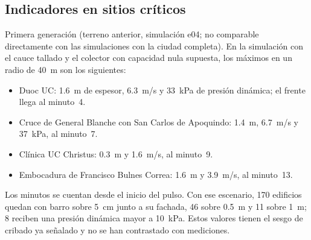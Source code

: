 \subsection{Indicadores en sitios críticos}\label{sec:res-indicadores}
Primera generación (terreno anterior, simulación e04; no comparable directamente con las simulaciones con la ciudad completa). En la simulación con el cauce tallado y el colector con capacidad nula supuesta, los máximos en un radio de \SI{40}{m} son los siguientes:
\begin{itemize}
\item Duoc UC: \SI{1,6}{m} de espesor, \SI{6,3}{m/s} y \SI{33}{kPa} de presión dinámica; el frente llega al minuto~4.
\item Cruce de General Blanche con San Carlos de Apoquindo: \SI{1,4}{m}, \SI{6,7}{m/s} y \SI{37}{kPa}, al minuto~7.
\item Clínica UC Christus: \SI{0,3}{m} y \SI{1,6}{m/s}, al minuto~9.
\item Embocadura de Francisco Bulnes Correa: \SI{1,6}{m} y \SI{3,9}{m/s}, al minuto~13.
\end{itemize}
Los minutos se cuentan desde el inicio del pulso. Con ese escenario, 170 edificios quedan con barro sobre \SI{5}{cm} junto a su fachada, 46 sobre \SI{0,5}{m} y 11 sobre \SI{1}{m}; 8 reciben una presión dinámica mayor a \SI{10}{kPa}. Estos valores tienen el sesgo de cribado ya señalado y no se han contrastado con mediciones.

